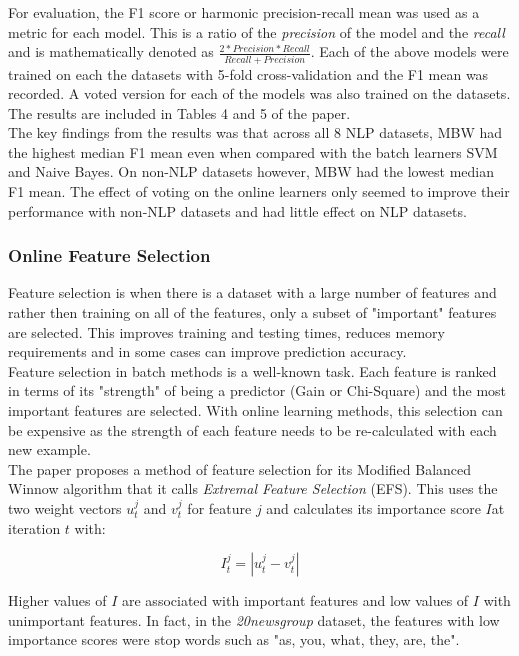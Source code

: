 \documentclass{article}
\begin{document}
For evaluation, the F1 score or harmonic precision-recall mean was used as a metric for each model. This is a ratio of 
the \emph{precision} of the model and the \emph{recall} and is mathematically denoted as \(\frac{2*Precision*Recall}{Recall+Precision}\). 
Each of the above models were trained on each the datasets with 5-fold cross-validation and the F1 mean was recorded. A voted version for each 
of the models was also trained on the datasets. The results are included in Tables 4 and 5 of the paper.\\

The key findings from the results was that across all 8 NLP datasets, MBW had the highest median F1 mean even when compared with the batch learners SVM and Naive Bayes.
On non-NLP datasets however, MBW had the lowest median F1 mean. The effect of voting on the online learners only seemed to improve their performance 
with non-NLP datasets and had little effect on NLP datasets.

\subsubsection*{Online Feature Selection}

Feature selection is when there is a dataset with a large number of features and rather then training on all of the features, only a 
subset of "important" features are selected. This improves training and testing times, reduces memory requirements and in some cases 
can improve prediction accuracy.\\

Feature selection in batch methods is a well-known task. Each feature is ranked in terms of its "strength" of being a predictor 
(Gain or Chi-Square) and the most important features are selected. With online learning methods, this selection can be expensive 
as the strength of each feature needs to be re-calculated with each new example.\\

The paper proposes a method of feature selection for its Modified Balanced Winnow algorithm that it calls \emph{Extremal Feature Selection} (EFS).
This uses the two weight vectors \(u_{t}^{j}\) and \(v_{t}^{j}\) for feature \(j\) and calculates its importance score \(I\)at iteration \(t\) with:

\[
    I_{t}^{j} = |u_{t}^{j} - v_{t}^{j}|
\]

Higher values of \(I\) are associated with important features and low values of \(I\) with unimportant features. In fact, in the \emph{20newsgroup} dataset,
the features with low importance scores were stop words such as "as, you, what, they, are, the".\\
\end{document}

